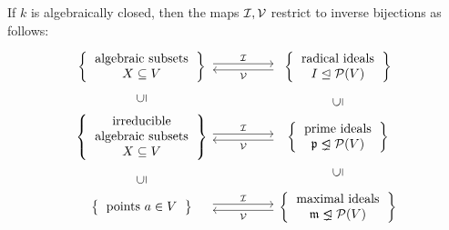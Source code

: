 \begin{theorem}
  If $k$ is algebraically closed, then the maps $\mathcal{I}, \mathcal{V}$ restrict to inverse bijections as follows:
  \[
    \begin{tikzcd}[column sep = huge]
          \left\{
            \begin{tabular}{c}
                algebraic subsets \\
                $X \subseteq V$
            \end{tabular}
          \right\}
          \arrow[shift left, shorten <= 1.5pt, shorten >= 4pt]{r}[above, xshift = -1.25 pt]{\mc{I}}
        & \left\{
            \begin{tabular}{c}
              radical ideals \\
              $I \idealeq \mc{P}(V)$
            \end{tabular}
          \right\}
          \arrow[shift left, shorten >= 1.5pt, shorten <= 4pt]{l}[below, xshift = -1.25 pt]{\mc{V}}
        \\
          \left\{
            \begin{tabular}{c}
                irreducible \\
                algebraic subsets \\
                $X \subseteq V$
            \end{tabular}
          \right\}
          \arrow[phantom]{u}[rotate=90]{\subseteq}
          \arrow[shift left, shorten >= 6.2pt]{r}[above, xshift = -3.1pt]{\mc{I}}
        & \left\{
            \begin{tabular}{c}
              prime ideals \\
              $\mf{p} \idealneq \mc{P}(V)$
            \end{tabular}
          \right\}
          \arrow[phantom]{u}[rotate=90]{\subseteq}
          \arrow[shift left, shorten <= 6.2pt]{l}[below, xshift = -3.1pt]{\mc{V}}
        \\
          \left\{
            \begin{tabular}{c}
              points $a \in V$
            \end{tabular}
          \right\}
          \arrow[phantom]{u}[rotate=90]{\subseteq}
          \arrow[shift left, shorten <= 12pt]{r}[above, xshift = 6pt]{\mc{I}}
        & \left\{
            \begin{tabular}{c}
              maximal ideals \\
              $\mf{m} \idealneq \mc{P}(V)$
            \end{tabular}
          \right\}
          \arrow[phantom]{u}[rotate=90]{\subseteq}
          \arrow[shift left,shorten >= 12pt]{l}[below, xshift = 6pt]{\mc{V}}
    \end{tikzcd}
  \]
\end{theorem}


